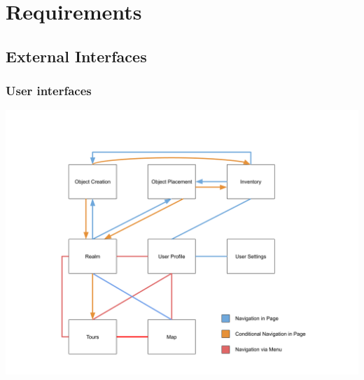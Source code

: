 \documentclass{article}
\begin{document}
\section{Requirements}


\subsection{External Interfaces}

\subsubsection{User interfaces}

\begin{center}
    \includegraphics[scale=0.4]{OtherDiagrams/ui_flow.png}
\end{center}
\end{document}
